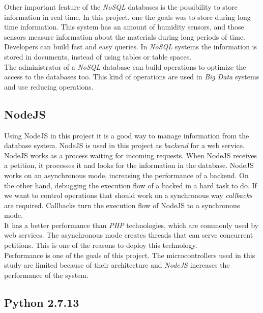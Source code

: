 Other important feature of the \textit{NoSQL} databases is the possibility to store information in real time. In this project, one the goals was to store during long time information. This system has an amount of humidity sensors, and those sensors measure information about the materials during long periods of time.\\

Developers can build fast and easy queries. In \textit{NoSQL} systems the information is stored in documents, instead of using tables or table spaces.\\

The administrator of a \textit{NoSQL} database can build operations to optimize the access to the databases too. This kind of operations are used in \textit{Big Data} systems and use reducing operations.

\subsection{NodeJS}

Using NodeJS in this project it is a good way to manage information from the database system. NodeJS is used in this project as \textit{backend} for a web service.\\

NodeJS works as a process waiting for incoming requests. When NodeJS receives a petition, it processes it and looks for the information in the database. NodeJS works on an asynchronous mode, increasing the performance of a backend. On the other hand, debugging the execution flow of a backed in a hard task to do. If we want to control operations that should work on a synchronous way \textit{callbacks} are required. Callbacks turn the execution flow of NodeJS to a synchronous mode.\\

It has a better performance than \textit{PHP} technologies, which are commonly used by web services. The asynchronous mode creates threads that can serve concurrent petitions. This is one of the reasons to deploy this technology.\\

Performance is one of the goals of this project. The microcontrollers used in this study are limited because of their architecture and \textit{NodeJS} increases the performance of the system.

\subsection{Python 2.7.13}

